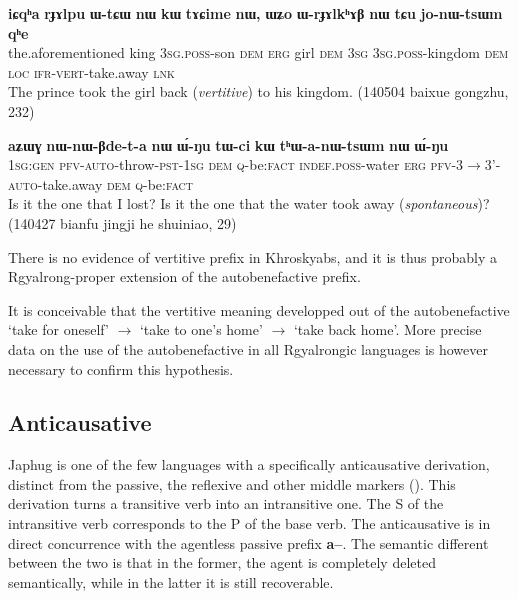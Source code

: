 \documentclass[oldfontcommands,oneside,a4paper,11pt]{article}
\newcommand{\ipa}[1]{\textbf{{\phon\mbox{#1}}}} %
\begin{document}
\begin{exe}
\ex \label{ex:jonWtsWm}
\gll
\ipa{iɕqʰa} 	\ipa{rɟɤlpu} 	\ipa{ɯ-tɕɯ} 	\ipa{nɯ} 	\ipa{kɯ} 	\ipa{tɤɕime} 	\ipa{nɯ,} 	\ipa{ɯʑo} 	\ipa{ɯ-rɟɤlkʰɤβ} 	\ipa{nɯ} 	\ipa{tɕu} 	\ipa{jo-nɯ-tsɯm} 	\ipa{qʰe} \\
the.aforementioned king \textsc{3sg.poss}-son \textsc{dem} \textsc{erg} girl \textsc{dem} \textsc{3sg} \textsc{3sg.poss}-kingdom \textsc{dem} \textsc{loc} \textsc{ifr-vert}-take.away \textsc{lnk} \\
\glt The prince took the girl back (\textit{vertitive}) to his kingdom. (140504 baixue gongzhu, 232)
\end{exe}



\begin{exe}
\ex \label{ex:thanWtsWm}
\gll
\ipa{aʑɯɣ} 	\ipa{nɯ-nɯ-βde-t-a} 	\ipa{nɯ} 	\ipa{ɯ́-ŋu} 	\ipa{tɯ-ci} 	\ipa{kɯ} 	\ipa{tʰɯ-a-nɯ-tsɯm} 	\ipa{nɯ} 	\ipa{ɯ́-ŋu} \\
\textsc{1sg:gen} \textsc{pfv-auto}-throw-\textsc{pst-1sg} \textsc{dem} \textsc{q}-be:\textsc{fact} \textsc{indef.poss}-water \textsc{erg} \textsc{pfv}-3$\rightarrow$3'-\textsc{auto}-take.away \textsc{dem} \textsc{q}-be:\textsc{fact} \\
\glt Is it the one that I lost? Is it the one that the water took away (\textit{spontaneous})? (140427 bianfu jingji he shuiniao, 29)
\end{exe}


There is no evidence of vertitive prefix in Khroskyabs, and it is thus probably a Rgyalrong-proper extension of the autobenefactive prefix.


It is conceivable that the vertitive meaning developped out of the autobenefactive `take for oneself' $\rightarrow$ `take to one's home' $\rightarrow$ `take back home'. More precise data on the use of the autobenefactive in all Rgyalrongic languages is however necessary to confirm this hypothesis.

\subsection{Anticausative}
Japhug is one of the few languages with a specifically anticausative derivation, distinct from the passive, the reflexive and other middle markers (\citealt{jacques12demotion}). This derivation turns a transitive verb into an intransitive one. The S of the intransitive verb corresponds to the P of the base verb. The anticausative is in direct concurrence with the agentless passive prefix \ipa{a--}. The semantic different between the two is that in the former, the agent is completely deleted semantically, while in the latter it is still recoverable.
\end{document}
